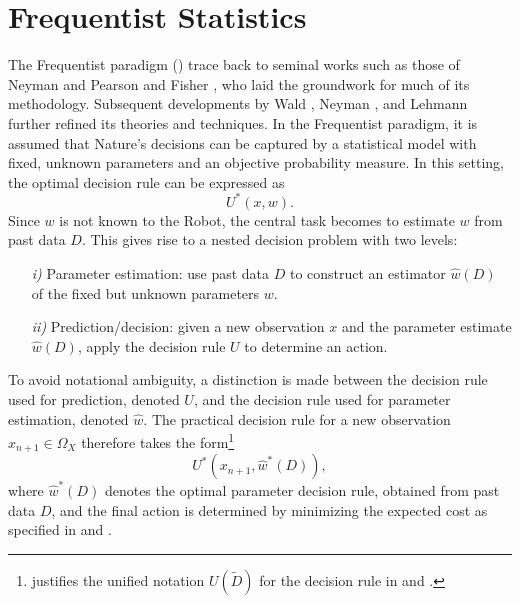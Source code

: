 \section{Frequentist Statistics}
\label{chp:freq}
The Frequentist paradigm () trace back to seminal works such as those of Neyman and Pearson \citep{Neyman1928OnSR} and Fisher \citep{fisher1925statistical}, who laid the groundwork for much of its methodology. Subsequent developments by Wald \citep{Wald1945Sequential}, Neyman \citep{Neyman1948Consistent}, and Lehmann \citep{lehmann1986testing} further refined its theories and techniques.\newline
In the Frequentist paradigm, it is assumed that Nature's decisions can be captured by a statistical model with fixed, unknown parameters and an objective probability measure. In this setting, the optimal decision rule can be expressed as
\begin{equation}
	U^*(x,w).
\end{equation}
Since $w$ is not known to the Robot, the central task becomes to estimate $w$ from past data $D$. This gives rise to a nested decision problem with two levels:
\begin{enumerate}
	\item[\textit{i)}] Parameter estimation: use past data $D$ to construct an estimator $\hat{w}(D)$ of the fixed but unknown parameters $w$.
	\item[\textit{ii)}] Prediction/decision: given a new observation $x$ and the parameter estimate $\hat{w}(D)$, apply the decision rule $U$ to determine an action.
\end{enumerate}
To avoid notational ambiguity, a distinction is made between the decision rule used for prediction, denoted $U$, and the decision rule used for parameter estimation, denoted $\hat{w}$. The practical decision rule for a new observation $x_{n+1} \in \Omega_X$ therefore takes the form\footnote{ justifies the unified notation $U(\tilde{D})$ for the decision rule in  and .}
\begin{equation}
	U^*(x_{n+1}, \hat{w}^*(D)),
	\label{eq:decision_rule_frequentist}
\end{equation}
where $\hat{w}^*(D)$ denotes the optimal parameter decision rule, obtained from past data $D$, and the final action is determined by minimizing the expected cost as specified in  and .


